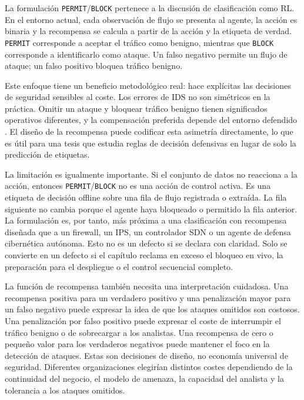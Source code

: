 La formulación \texttt{PERMIT}/\texttt{BLOCK} pertenece a la discusión de clasificación como RL. En el entorno actual, cada observación de flujo se presenta al agente, la acción es binaria y la recompensa se calcula a partir de la acción y la etiqueta de verdad. \texttt{PERMIT} corresponde a aceptar el tráfico como benigno, mientras que \texttt{BLOCK} corresponde a identificarlo como ataque. Un falso negativo permite un flujo de ataque; un falso positivo bloquea tráfico benigno.

Este enfoque tiene un beneficio metodológico real: hace explícitas las decisiones de seguridad sensibles al coste. Los errores de IDS no son simétricos en la práctica. Omitir un ataque y bloquear tráfico benigno tienen significados operativos diferentes, y la compensación preferida depende del entorno defendido \parencite{Lee2002CostSensitiveIDS,Cardenas2006IDSFramework}. El diseño de la recompensa puede codificar esta asimetría directamente, lo que es útil para una tesis que estudia reglas de decisión defensivas en lugar de solo la predicción de etiquetas.

La limitación es igualmente importante. Si el conjunto de datos no reacciona a la acción, entonces \texttt{PERMIT}/\texttt{BLOCK} no es una acción de control activa. Es una etiqueta de decisión offline sobre una fila de flujo registrada o extraída. La fila siguiente no cambia porque el agente haya bloqueado o permitido la fila anterior. La formulación es, por tanto, más próxima a una clasificación con recompensa diseñada que a un firewall, un IPS, un controlador SDN o un agente de defensa cibernética autónoma. Esto no es un defecto si se declara con claridad. Solo se convierte en un defecto si el capítulo reclama en exceso el bloqueo en vivo, la preparación para el despliegue o el control secuencial completo.

La función de recompensa también necesita una interpretación cuidadosa. Una recompensa positiva para un verdadero positivo y una penalización mayor para un falso negativo puede expresar la idea de que los ataques omitidos son costosos. Una penalización por falso positivo puede expresar el coste de interrumpir el tráfico benigno o de sobrecargar a los analistas. Una recompensa de cero o pequeño valor para los verdaderos negativos puede mantener el foco en la detección de ataques. Estas son decisiones de diseño, no economía universal de seguridad. Diferentes organizaciones elegirían distintos costes dependiendo de la continuidad del negocio, el modelo de amenaza, la capacidad del analista y la tolerancia a los ataques omitidos.

